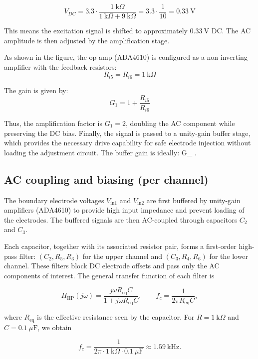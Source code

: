 \[
V_{DC} = 3.3 \cdot \frac{1~\text{k}\Omega}{1~\text{k}\Omega + 9~\text{k}\Omega} 
= 3.3 \cdot \frac{1}{10} 
= 0.33~\text{V}
\]  

This means the excitation signal is shifted to approximately $0.33~\text{V}$ DC. 
The AC amplitude is then adjusted by the amplification stage.

As shown in the figure, the op-amp (ADA4610) is configured as a non-inverting amplifier with the feedback resistors:  
\[
R_{i5} = R_{i6} = 1~\text{k}\Omega
\]

The gain is given by:  
\begin{equation}
G_1 = 1 + \frac{R_{i5}}{R_{i6}}
\end{equation}

Thus, the amplification factor is $G_1 = 2$, doubling the AC component while preserving the DC bias. 
Finally, the signal is passed to a unity-gain buffer stage, which provides the necessary drive capability for safe electrode injection without loading the adjustment circuit.
The buffer gain is ideally:
    G_{} .

\subsection{AC coupling and biasing (per channel)}
The boundary electrode voltages $V_{\text{in1}}$ and $V_{\text{in2}}$ are first buffered
by unity-gain amplifiers (ADA4610) to provide high input impedance and prevent
loading of the electrodes. The buffered signals are then AC-coupled through
capacitors $C_{2}$ and $C_{3}$.

Each capacitor, together with its associated resistor pair, forms a first-order
high-pass filter: $(C_{2},R_{5},R_{3})$ for the upper channel and
$(C_{3},R_{4},R_{6})$ for the lower channel. These filters block DC electrode
offsets and pass only the AC components of interest. The general transfer
function of each filter is

\begin{equation}
  H_{\mathrm{HP}}(j\omega) = \frac{j\omega R_{\mathrm{eq}} C}{1 + j\omega R_{\mathrm{eq}} C},
  \qquad f_c = \frac{1}{2\pi R_{\mathrm{eq}} C},
\end{equation}

where $R_{\mathrm{eq}}$ is the effective resistance seen by the capacitor. For
$R=1~\text{k}\Omega$ and $C=0.1~\mu\text{F}$, we obtain

\[
f_c = \frac{1}{2 \pi \cdot 1~\text{k}\Omega \cdot 0.1~\mu\text{F}}
     \approx 1.59~\text{kHz}.
\]

